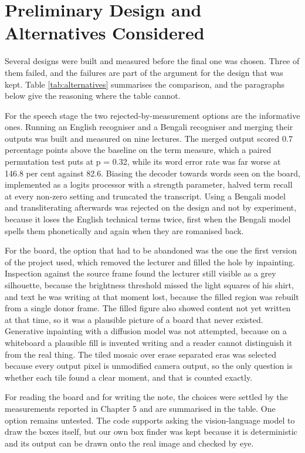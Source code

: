 \section{Preliminary Design and Alternatives Considered}

Several designs were built and measured before the final one was chosen. Three of them
failed, and the failures are part of the argument for the design that was kept. Table
\ref{tab:alternatives} summarises the comparison, and the paragraphs below give the
reasoning where the table cannot.

For the speech stage the two rejected-by-measurement options are the informative ones.
Running an English recogniser and a Bengali recogniser and merging their outputs was built
and measured on nine lectures. The merged output scored 0.7 percentage points above the
baseline on the term measure, which a paired permutation test puts at p = 0.32, while its
word error rate was far worse at 146.8 per cent against 82.6. Biasing the decoder towards
words seen on the board, implemented as a logits processor with a strength parameter,
halved term recall at every non-zero setting and truncated the transcript. Using a Bengali
model and transliterating afterwards was rejected on the design and not by experiment,
because it loses the English technical terms twice, first when the Bengali model spells
them phonetically and again when they are romanised back.

For the board, the option that had to be abandoned was the one the first version of the
project used, which removed the lecturer and filled the hole by inpainting. Inspection
against the source frame found the lecturer still visible as a grey silhouette, because
the brightness threshold missed the light squares of his shirt, and text he was writing at
that moment lost, because the filled region was rebuilt from a single donor frame. The
filled figure also showed content not yet written at that time, so it was a plausible
picture of a board that never existed. Generative inpainting with a diffusion model was
not attempted, because on a whiteboard a plausible fill is invented writing and a reader
cannot distinguish it from the real thing. The tiled mosaic over erase separated eras was
selected because every output pixel is unmodified camera output, so the only question is
whether each tile found a clear moment, and that is counted exactly.

For reading the board and for writing the note, the choices were settled by the
measurements reported in Chapter 5 and are summarised in the table. One option remains
untested. The code supports asking the vision-language model to draw the boxes itself, but
our own box finder was kept because it is deterministic and its output can be drawn onto
the real image and checked by eye.

